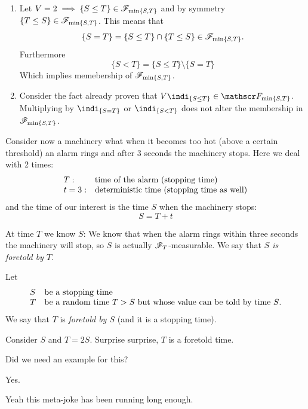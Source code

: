 \documentclass{report}
\begin{document}
\begin{fancyproof}
\begin{enumerate}
\begin{enumerate}
 	\item Let $V=2\implies\{S\leq T\}\in\mathscr{F}_{\min\{S,T\}}$ and by symmetry $\{T\leq S\}\in\mathscr{F}_{\min\{S,T\}}$. This means that 
 	\begin{equation*}
 		\{S=T\}=\{S\leq T\}\cap\{T\leq S\}\in\mathscr{F}_{\min\{S,T\}}.
 	\end{equation*}
 	Furthermore 
 	\[\{S<T\}=\{S\leq T\}\setminus\{S=T\}\]
 	Which implies memebership of $\mathscr{F}_{\min\{S,T\}}$.
 	\item Consider the fact already proven that $V\indi_{\{S\leq T\}}\in\F_{\min\{S,T\}}$. Multiplying by $\indi_{\{S=T\}}$ or $\indi_{\{S<T\}}$ does not alter the membership in $\mathscr{F}_{\min\{S,T\}}$.
 \end{enumerate}
 	\end{enumerate}
\end{fancyproof}
Consider now a machinery what when it becomes too hot (above a certain threshold) an alarm rings and after 3 seconds the machinery stops. Here we deal with 2 times:
\begin{equation*}
	\begin{array}{l l}
		T: &\text{time of the alarm (stopping time)}\\
		t=3: &\text{deterministic time (stopping time as well)}\\
	\end{array} 
\end{equation*}
and the time of our interest is the time $S$ when the machinery stops:
$$S=T+t$$
\begin{remark}
	At time $T$ we know $S$: We know that when the alarm rings within three seconds the machinery will stop, so $S$ is actually $\mathscr{F}_T$-measurable. We say that \emph{$S$ is foretold by $T$}.
\end{remark}
\begin{definition}
	Let 
	\begin{equation*}
		\begin{array}{l l}
			S &\text{be a stopping time}\\
			T &\text{be a random time $T>S$ but whose value can be told by time $S$.}
		\end{array}
	\end{equation*}
	We say that $T$ is \emph{foretold by $S$} (and it is a stopping time).
\end{definition}
\begin{example}
	Consider $S$ and $T=2S$. Surprise surprise, $T$ is a foretold time.
\end{example}
Did we need an example for this?
\begin{example}
	Yes.
\end{example}
Yeah this meta-joke has been running long enough.
\end{document}

